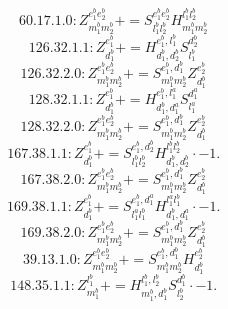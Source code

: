 \documentclass[letterpaper,10pt,fleqn,leqno,onecolumn]{article}
\begin{document}
\begin{equation} \;\;\;\;\;\;  60.17.1.0: Z^{e_{1}^{b}e_{2}^{b}}_{m_{1}^{b}m_{2}^{b}}+=S^{e_{1}^{b}e_{2}^{b}}_{l_{1}^{b}l_{2}^{b}}H^{l_{1}^{b}l_{2}^{b}}_{m_{1}^{b}m_{2}^{b}} \end{equation}
\begin{equation} \;\;\;\;\;\;  126.32.1.1: Z^{e_{1}^{b}}_{d_{1}^{b}}+=H^{e_{1}^{b},l_{1}^{b}}_{d_{1}^{b},d_{2}^{b}}S^{d_{2}^{b}}_{l_{1}^{b}} \end{equation}
\begin{equation} \;\;\;\;\;\;  126.32.2.0: Z^{e_{1}^{b}e_{2}^{b}}_{m_{1}^{b}m_{2}^{b}}+=S^{e_{1}^{b},d_{1}^{b}}_{m_{1}^{b}m_{2}^{b}}Z^{e_{2}^{b}}_{d_{1}^{b}} \end{equation}
\begin{equation} \;\;\;\;\;\;  128.32.1.1: Z^{e_{1}^{b}}_{d_{1}^{b}}+=H^{e_{1}^{b},l_{1}^{a}}_{d_{1}^{b},d_{1}^{a}}S^{d_{1}^{a}}_{l_{1}^{a}} \end{equation}
\begin{equation} \;\;\;\;\;\;  128.32.2.0: Z^{e_{1}^{b}e_{2}^{b}}_{m_{1}^{b}m_{2}^{b}}+=S^{e_{1}^{b},d_{1}^{b}}_{m_{1}^{b}m_{2}^{b}}Z^{e_{2}^{b}}_{d_{1}^{b}} \end{equation}
\begin{equation} \;\;\;\;\;\;  167.38.1.1: Z^{e_{1}^{b}}_{d_{1}^{b}}+=S^{e_{1}^{b},d_{2}^{b}}_{l_{1}^{b}l_{2}^{b}}H^{l_{1}^{b}l_{2}^{b}}_{d_{1}^{b},d_{2}^{b}}\cdot -1. \end{equation}
\begin{equation} \;\;\;\;\;\;  167.38.2.0: Z^{e_{1}^{b}e_{2}^{b}}_{m_{1}^{b}m_{2}^{b}}+=S^{e_{1}^{b},d_{1}^{b}}_{m_{1}^{b}m_{2}^{b}}Z^{e_{2}^{b}}_{d_{1}^{b}} \end{equation}
\begin{equation} \;\;\;\;\;\;  169.38.1.1: Z^{e_{1}^{b}}_{d_{1}^{b}}+=S^{e_{1}^{b},d_{1}^{a}}_{l_{1}^{a}l_{1}^{b}}H^{l_{1}^{a}l_{1}^{b}}_{d_{1}^{b},d_{1}^{a}}\cdot -1. \end{equation}
\begin{equation} \;\;\;\;\;\;  169.38.2.0: Z^{e_{1}^{b}e_{2}^{b}}_{m_{1}^{b}m_{2}^{b}}+=S^{e_{1}^{b},d_{1}^{b}}_{m_{1}^{b}m_{2}^{b}}Z^{e_{2}^{b}}_{d_{1}^{b}} \end{equation}
\begin{equation} \;\;\;\;\;\;  39.13.1.0: Z^{e_{1}^{b}e_{2}^{b}}_{m_{1}^{b}m_{2}^{b}}+=S^{e_{1}^{b},d_{1}^{b}}_{m_{1}^{b}m_{2}^{b}}H^{e_{2}^{b}}_{d_{1}^{b}} \end{equation}
\begin{equation} \;\;\;\;\;\;  148.35.1.1: Z^{l_{1}^{b}}_{m_{1}^{b}}+=H^{l_{1}^{b},l_{2}^{b}}_{m_{1}^{b},d_{1}^{b}}S^{d_{1}^{b}}_{l_{2}^{b}}\cdot -1. \end{equation}
\end{document}
